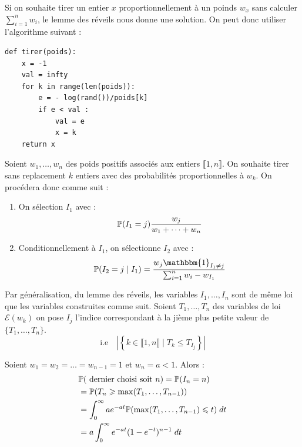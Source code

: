 \begin{remark}
    Si on souhaite tirer un entier $x$ proportionnellement à un poinds $w_x$ sans calculer $ \sum_{i=1}^{n} w_i$, 
    le lemme des réveils nous donne une solution. On peut donc utiliser l'algorithme suivant : 
    \begin{lstlisting}
def tirer(poids): 
    x = -1
    val = infty
    for k in range(len(poids)):
        e = - log(rand())/poids[k]
        if e < val : 
            val = e 
            x = k
    return x
    \end{lstlisting}
\end{remark}

\begin{example}
    Soient $w_1, \dots, w_n$ des poids positifs associés aux entiers $ \llbracket 1, n \rrbracket $. On souhaite 
    tirer sans replacement $k$ entiers avec des probabilités proportionnelles à $w_k$. 
    On procédera donc comme suit : 
    \begin{enumerate}
        \item On sélection $I_1$ avec : 
            $$ \mathbb{P}(I_1 = j) \frac{w_j}{ w_1 + \dots + w_n} $$ 
        \item Conditionnellement à $I_1$, on sélectionne $I_2$ avec : 
            $$ \myP(I_2 = j \mid I_1) = \frac{w_j \mathbbm{1}_{I_1 \not = j}}{ \sum_{i=1}^{n} w_i - w_{I_1}} $$     
    \end{enumerate}
    Par généralisation, du lemme des réveils, les variables $I_1, \dots, I_n$ sont de même loi que les variables 
    construites comme suit. Soient $T_1, \dots, T_n$ des variables de loi $ \mathcal{E}(w_k)$ on pose 
    $I_j$ l'indice correspondant à la jième plus petite valeur de $\{T_1, \dots, T_n\}$. 
        $$ \text{i.e} \quad \left| \left\{ k \in \llbracket 1, n \rrbracket \mid T_k \leqslant T_{I_j}\right\}\right| $$   
\end{example}

\begin{example}
    Soient $w_1 = w_2 = \dots = w_{n-1} = 1$ et $w_n = a < 1$. Alors : 
        \begin{align*}
            & \mathbb{P}( \text{ dernier choisi soit } n ) = \mathbb{P}(I_n = n) \\ 
            &= \mathbb{P}(T_n \geqslant \max(T_1, \dots, T_{n-1})) \\
            &= \int_{0}^{\infty} a e^{-at} \mathbb{P}( \max (T_1, \dots, T_{n-1}) \leqslant t) \; dt \\ 
            &= a \int_{0}^{\infty} e^{-at} (1 - e^{-t})^{n-1} \; dt  
        \end{align*} 
\end{example}

